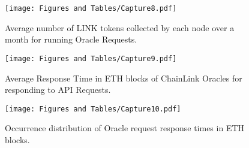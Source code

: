 \documentclass[runningheads]{llncs}
\begin{document}
\begin{figure}
\begin{center}
\texttt{[image: Figures and Tables/Capture8.pdf]}
\caption{Average number of LINK tokens collected by each node over a month for running Oracle Requests.}
\label{fig:disAPIpermonth}
\end{center}
\end{figure}
\vspace{-5pt}


\begin{figure}
\begin{center}
\texttt{[image: Figures and Tables/Capture9.pdf]}
\caption{Average Response Time in ETH blocks of ChainLink Oracles for responding to API Requests.}
\label{fig:disAPIpermonth}
\end{center}
\end{figure}
\vspace{-5pt}

\begin{figure}
\begin{center}
\texttt{[image: Figures and Tables/Capture10.pdf]}
\caption{Occurrence distribution of Oracle request response times in ETH blocks.}
\label{fig:disAPIpermonth}
\end{center}
\end{figure}
\vspace{-5pt}
\fi
\end{document}
